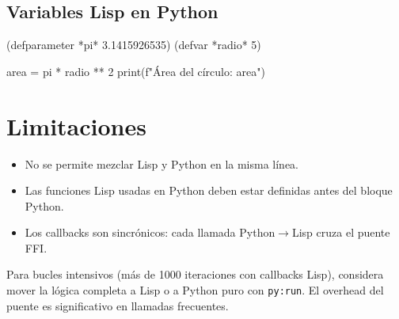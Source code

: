\subsection{Variables Lisp en Python}
\begin{lispcode}
(defparameter *pi* 3.1415926535)
(defvar *radio* 5)

area = pi * radio ** 2
print(f"Área del círculo: {area}")
\end{lispcode}

\section{Limitaciones}

\begin{itemize}
\item No se permite mezclar Lisp y Python en la misma línea.
\item Las funciones Lisp usadas en Python deben estar definidas antes del bloque Python.
\item Los callbacks son sincrónicos: cada llamada Python$\to$Lisp cruza el puente FFI.
\end{itemize}

\begin{notebox}[title=Rendimiento]
Para bucles intensivos (más de 1000 iteraciones con callbacks Lisp), considera
mover la lógica completa a Lisp o a Python puro con \texttt{py:run}. El overhead
del puente es significativo en llamadas frecuentes.
\end{notebox}

